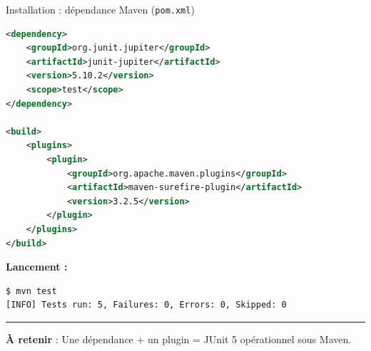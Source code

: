 \documentclass[aspectratio=169,11pt]{beamer}
\newcommand{\takeaway}[1]{%
\vfill\begin{beamercolorbox}[wd=\linewidth,sep=0.4em]{}
\color{accent2}\rule[0.6ex]{1.2em}{1.2pt}\hspace{0.4em}%
\textbf{\color{accent2}\small À retenir} \textcolor{textsoft}{:} %
{\small\color{textmain}#1}
\end{beamercolorbox}}
\begin{document}
\begin{frame}[fragile,t,shrink=20]{Installation : dépendance Maven (\texttt{pom.xml})}
\begin{lstlisting}[style=javadark, language=XML, morekeywords={dependency,groupId,artifactId,version,scope,build,plugin}]
<dependency>
    <groupId>org.junit.jupiter</groupId>
    <artifactId>junit-jupiter</artifactId>
    <version>5.10.2</version>
    <scope>test</scope>
</dependency>

<build>
    <plugins>
        <plugin>
            <groupId>org.apache.maven.plugins</groupId>
            <artifactId>maven-surefire-plugin</artifactId>
            <version>3.2.5</version>
        </plugin>
    </plugins>
</build>
\end{lstlisting}
\vspace{0.2cm}
\textbf{Lancement :}
\begin{lstlisting}[style=bashdark]
$ mvn test
[INFO] Tests run: 5, Failures: 0, Errors: 0, Skipped: 0
\end{lstlisting}
\takeaway{Une dépendance + un plugin = JUnit 5 opérationnel sous Maven.}
\end{frame}
\end{document}
